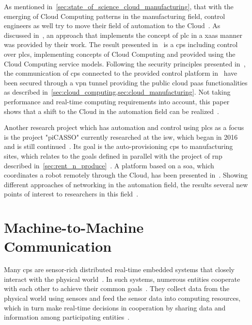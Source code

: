 \documentclass[
a4paper,
twoside,
headsepline,
cleardoublepage=empty,
parskip=half,
draft=false
]{scrbook}
\begin{document}
			As mentioned in~\cref{sec:state_of_science_cloud_manufacturing}, that with the emerging of Cloud Computing patterns in the manufacturing field, control engineers as well try to move their field of automation to the Cloud~\cite{schlechtendahl2017extended}.
			As discussed in~\cite{haridas2018cloud}, an approach that implements the concept of \gls{plc} in a \gls{xaas} manner was provided by their work. 
			The result presented in~\cite{haridas2018cloud} is a \gls{cps} including control over \gls{plc}s, implementing concepts of Cloud Computing and provided using the Cloud Computing service models.
			Following the security principles presented in~\cite{tanaka2017directed}, the communication of \gls{cps} connected to the provided control platform in~\cite{haridas2018cloud} have been secured through a \gls{vpn} tunnel providing the public cloud \gls{paas} functionalities as described in~\cref{sec:cloud_computing,sec:cloud_manufacturing}.
			Not taking performance and real-time computing requirements into account, this paper shows that a shift to the Cloud in the automation field can be realized~\cite{haridas2018cloud}.
			
			Another research project which has automation and control using \gls{plc}s as a focus is the project "piCASSO" currently researched at the \gls{isw}, which began in 2016 and is still continued~\cite{kretschmer2016communication}.
			Its goal is the auto-provisioning \gls{cps} to manufacturing sites, which relates to the goals defined in parallel with the project of \gls{rnp} described in~\cref{sec:rent_n_produce}~\cite{xen.17b}.
			A platform based on a \gls{soa}, which coordinates a robot remotely through the Cloud, has been presented in~\cite{kretschmer2016communication}. 
			Showing different approaches of networking in the automation field, the results several new points of interest to researchers in this field~\cite{kretschmer2016communication}.

		\section{Machine-to-Machine Communication}\label{sec:machine_to_machine_communication}
			
			Many \gls{cps} are sensor-rich distributed real-time embedded systems that closely interact with the physical world~\cite{zhao2017machine}. 
			In such systems, numerous entities cooperate with each other to achieve their common goals~\cite{li20185g}. 
			They collect data from the physical world using sensors and feed the sensor data into computing resources, which in turn make real-time decisions in cooperation by sharing data and information among participating entities~\cite{ren2017cloud}.
			
\end{document}
